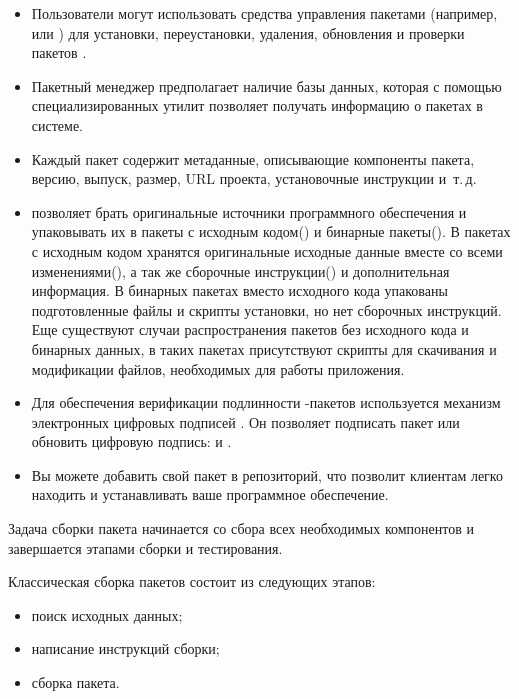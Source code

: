 \begin{itemize}
	\item Пользователи могут использовать средства управления пакетами (например,  или 
		) для установки, переустановки, удаления, обновления и проверки пакетов .
	\item Пакетный менеджер  предполагает наличие базы данных, которая с помощью специализированных 
		утилит позволяет получать информацию о пакетах в системе.
	\item Каждый пакет  содержит метаданные, описывающие компоненты пакета, версию, выпуск, 
		размер, URL проекта, установочные инструкции и~т.\,д.
	\item {} позволяет брать оригинальные источники программного обеспечения и упаковывать их в 
		пакеты с исходным кодом() и бинарные пакеты(). В пакетах с исходным кодом 
		хранятся оригинальные исходные данные вместе со всеми изменениями(), а так же сборочные 
		инструкции() и дополнительная информация. В бинарных пакетах вместо исходного кода 
		упакованы подготовленные файлы и скрипты установки, но нет сборочных инструкций. Еще существуют 
		случаи распространения пакетов без исходного кода и бинарных данных, в таких пакетах присутствуют 
		скрипты для скачивания и модификации файлов, необходимых для работы приложения.
	\item Для обеспечения верификации подлинности -пакетов используется механизм электронных цифровых 
		подписей . Он позволяет подписать  пакет или обновить цифровую подпись: 
		 и .
	\item Вы можете добавить свой пакет в  репозиторий, что позволит клиентам легко находить и 
		устанавливать ваше программное обеспечение.
\end{itemize}

Задача сборки пакета начинается со сбора всех необходимых компонентов и завершается этапами сборки и тестирования.

Классическая сборка пакетов  состоит из следующих этапов:%

\begin{itemize}
	\item поиск исходных данных;
	\item написание инструкций сборки;
	\item сборка пакета.
\end{itemize}

